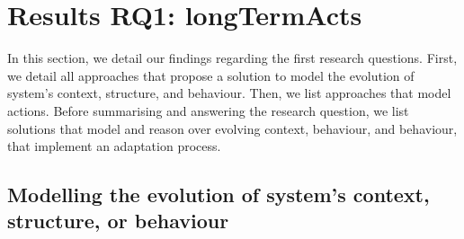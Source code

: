 \section[Results RQ1: long-term actions]{Results RQ1: \glspl{longTermAct}}
\label{sec:sota:results:actions}

In this section, we detail our findings regarding the first research questions.
First, we detail all approaches that propose a solution to model the evolution of system's \gls{context}, \gls{structure}, and \gls{behaviour}.
Then, we list approaches that model \glspl{action}.
Before summarising and answering the research question, we list solutions that model and reason over evolving \gls{context}, \gls{behaviour}, and \gls{behaviour}, \ie that implement an adaptation process.

\subsection[Modelling the evolution of system's context, structure, or behaviour]{Modelling the evolution of system's \gls{context}, \gls{structure}, or \gls{behaviour}}

